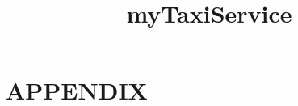 \documentclass[notoc,a4paper]{tufte-book}
\title{myTaxiService}
\begin{document}



\setcounter{tocdepth}{2}
\tableofcontents









\chapter{APPENDIX}


\end{document}
